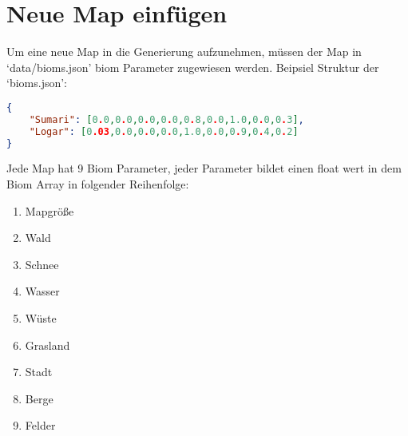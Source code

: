 \section{Neue Map einfügen}
Um eine neue Map in die Generierung aufzunehmen, müssen der Map in `data/bioms.json' biom Parameter zugewiesen werden. \newline
Beipsiel Struktur der `bioms.json':

\begin{lstlisting}[language=json, firstnumber=1]
{
    "Sumari": [0.0,0.0,0.0,0.0,0.8,0.0,1.0,0.0,0.3],
    "Logar": [0.03,0.0,0.0,0.0,1.0,0.0,0.9,0.4,0.2]
}
\end{lstlisting}
Jede Map hat 9 Biom Parameter, jeder Parameter bildet einen float wert in dem Biom Array in folgender Reihenfolge:
\begin{enumerate}
    \item Mapgröße
    \item Wald
    \item Schnee
    \item Wasser
    \item Wüste
    \item Grasland
    \item Stadt
    \item Berge
    \item Felder
\end{enumerate}